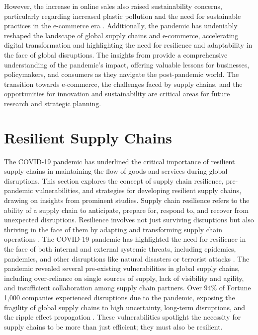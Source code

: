 However, the increase in online sales also raised sustainability concerns, particularly regarding increased plastic pollution and the need for sustainable practices in the e-commerce era \parencite{Charlebois2021SupplyStudy}. Additionally, the pandemic has undeniably reshaped the landscape of global supply chains and e-commerce, accelerating digital transformation and highlighting the need for resilience and adaptability in the face of global disruptions. The insights from \textcite{Charlebois2021SupplyStudy, Miljenovic2022PandemicsPandemic, Din2022ThePurchasing, KofiMensah2021Cross-BorderReview} provide a comprehensive understanding of the pandemic's impact, offering valuable lessons for businesses, policymakers, and consumers as they navigate the post-pandemic world. The transition towards e-commerce, the challenges faced by supply chains, and the opportunities for innovation and sustainability are critical areas for future research and strategic planning.

\section{Resilient Supply Chains}

The COVID-19 pandemic has underlined the critical importance of resilient supply chains in maintaining the flow of goods and services during global disruptions. This section explores the concept of supply chain resilience, pre-pandemic vulnerabilities, and strategies for developing resilient supply chains, drawing on insights from prominent studies. Supply chain resilience refers to the ability of a supply chain to anticipate, prepare for, respond to, and recover from unexpected disruptions. Resilience involves not just surviving disruptions but also thriving in the face of them by adapting and transforming supply chain operations \parencite{Mishra2024RedefiningFactors, Michel2023DimensionsPandemic, Cherrafi2022DigitalEra}. The COVID-19 pandemic has highlighted the need for resilience in the face of both internal and external systemic threats, including epidemics, pandemics, and other disruptions like natural disasters or terrorist attacks \parencite{Michel2023DimensionsPandemic}. The pandemic revealed several pre-existing vulnerabilities in global supply chains, including over-reliance on single sources of supply, lack of visibility and agility, and insufficient collaboration among supply chain partners. Over 94\% of Fortune 1,000 companies experienced disruptions due to the pandemic, exposing the fragility of global supply chains to high uncertainty, long-term disruptions, and the ripple effect propagation \parencite{Cherrafi2022DigitalEra}. These vulnerabilities spotlight the necessity for supply chains to be more than just efficient; they must also be resilient.

